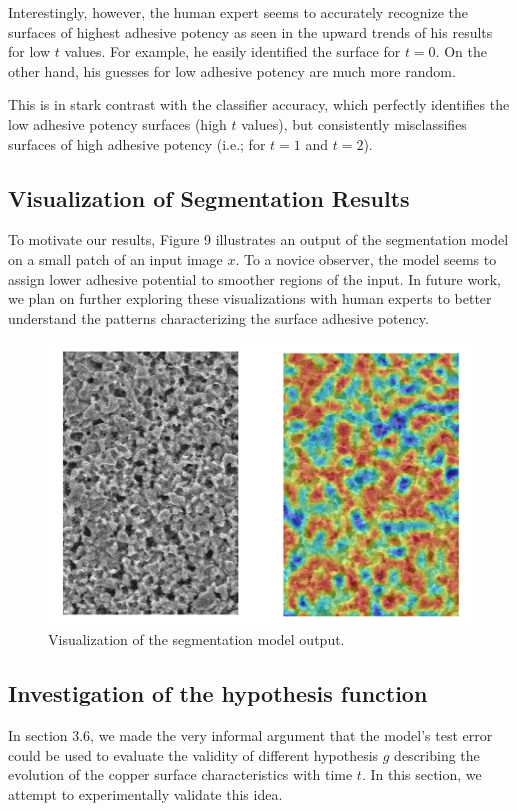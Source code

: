 \documentclass[10pt,twocolumn,letterpaper]{article}
\begin{document}
Interestingly, however, the human expert seems to accurately recognize 
the surfaces of highest adhesive potency as seen in the upward trends of his results 
for low $t$ values. For example, he easily identified the surface for $t=0$.
On the other hand, his guesses for low adhesive potency are much more random.

This is in stark contrast with the classifier accuracy, which perfectly identifies
the low adhesive potency surfaces (high $t$ values), but consistently misclassifies 
surfaces of high adhesive potency (i.e.; for $t=1$ and $t=2$).

\subsection{Visualization of Segmentation Results}

To motivate our results, Figure 9 illustrates an output of the segmentation model on a small patch of an input image $x$.
To a novice observer, the model seems to assign lower adhesive potential to smoother regions of the input.
In future work, we plan on further exploring these visualizations with human experts to better understand the 
patterns characterizing the surface adhesive potency.

\begin{figure}[h]
	\centering
	\includegraphics[width=0.9\linewidth]{"./figures/Figure9"}
	\caption{
		Visualization of the segmentation model output.
	}
\end{figure}

\subsection{Investigation of the hypothesis function}
In section 3.6, we made the very informal argument that the model's test error could be used
to evaluate the validity of different hypothesis $g$ describing the evolution of
the copper surface characteristics with time $t$. 
In this section, we attempt to experimentally validate this idea.
\end{document}
